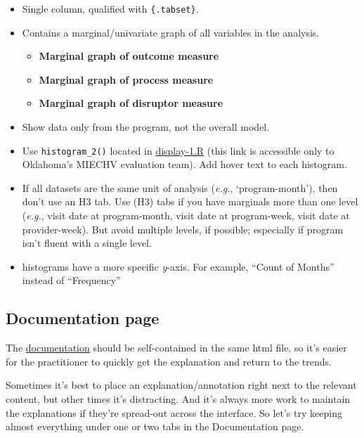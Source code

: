 \documentclass[
]{book}
\providecommand{\tightlist}{%
  \setlength{\itemsep}{0pt}\setlength{\parskip}{0pt}}
\begin{document}
\begin{itemize}
\item
  Single column, qualified with \texttt{\{.tabset\}}.
\item
  Contains a marginal/univariate graph of all variables in the analysis.

  \begin{itemize}
  \tightlist
  \item
    \textbf{Marginal graph of outcome measure}
  \item
    \textbf{Marginal graph of process measure}
  \item
    \textbf{Marginal graph of disruptor measure}
  \end{itemize}
\item
  Show data only from the program, not the overall model.
\item
  Use \texttt{histogram\_2()} located in \href{https://github.com/OuhscBbmc/miechv-3/blob/master/analysis/common/display-1.R}{display-1.R} (this link is accessible only to Oklahoma's MIECHV evaluation team). Add hover text to each histogram.
\item
  If all datasets are the same unit of analysis (\emph{e.g.}, `program-month'), then don't use an H3 tab. Use (H3) tabs if you have marginals more than one level (\emph{e.g.}, visit date at program-month, visit date at program-week, visit date at provider-week). But avoid multiple levels, if possible; especially if program isn't fluent with a single level.
\item
  histograms have a more specific \emph{y}-axis. For example, ``Count of Months'' instead of ``Frequency''
\end{itemize}

\hypertarget{documentation-page}{%
\subsection{Documentation page}\label{documentation-page}}

The \href{https://ouhscbbmc.github.io/data-science-practices-1/dashboard-1.html\#documentation}{documentation} should be self-contained in the same html file, so it's easier for the practitioner to quickly get the explanation and return to the trends.

Sometimes it's best to place an explanation/annotation right next to the relevant content, but other times it's distracting. And it's always more work to maintain the explanations if they're spread-out across the interface. So let's try keeping almost everything under one or two tabs in the Documentation page.
\end{document}
